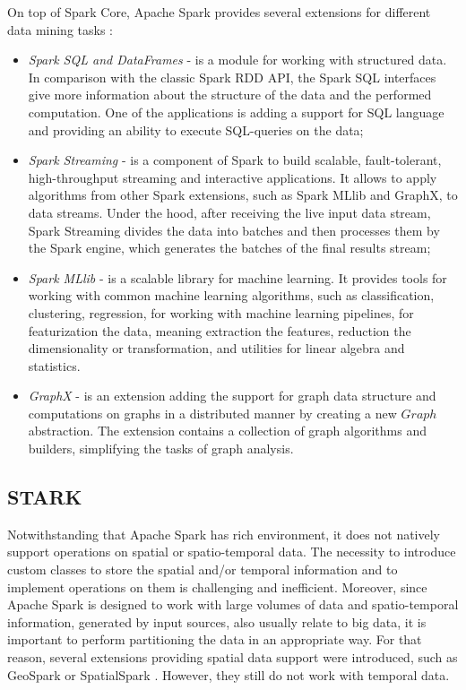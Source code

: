On top of Spark Core, Apache Spark provides several extensions for different data mining tasks \cite{online:apache_spark}:
\begin{itemize}
	\item \textit{Spark SQL and DataFrames} - is a module for working with structured data. In comparison with the classic Spark RDD API, the Spark SQL interfaces give more information about the structure of the data and the performed computation. One of the applications is adding a support for SQL language and providing an ability to execute SQL-queries on the data;
	\item \textit{Spark Streaming} - is a component of Spark to build scalable, fault-tolerant, high-throughput streaming and interactive applications. It allows to apply algorithms from other Spark extensions, such as Spark MLlib and GraphX, to data streams. Under the hood, after receiving the live input data stream, Spark Streaming divides the data into batches and then processes them by the Spark engine, which generates the batches of the final results stream;
	\item \textit{Spark MLlib} - is a scalable library for machine learning. It provides tools for working with common machine learning algorithms, such as classification, clustering, regression, for working with machine learning pipelines, for featurization the data, meaning extraction the features, reduction the dimensionality or transformation, and utilities for linear algebra and statistics.
	\item \textit{GraphX} - is an extension adding the support for graph data structure and computations on graphs in a distributed manner by creating a new $Graph$ abstraction. The extension contains a collection of graph algorithms and builders, simplifying the tasks of graph analysis.
\end{itemize}

\subsection{STARK}
Notwithstanding that Apache Spark has rich environment, it does not natively support operations on spatial or spatio-temporal data. The necessity to introduce custom classes to store the spatial and/or temporal information and to implement operations on them is challenging and inefficient. Moreover, since Apache Spark is designed to work with large volumes of data and spatio-temporal information, generated by input sources, also usually relate to big data, it is important to perform partitioning the data in an appropriate way. For that reason, several extensions providing spatial data support were introduced, such as GeoSpark \cite{inproceedings:geospark_intro}\cite{inproceedings:geospark} or SpatialSpark \cite{inproceedings:spatial_spark}. However, they still do not work with temporal data.

